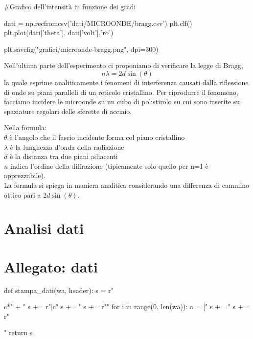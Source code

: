 \begin{sagesilent}
#Grafico dell'intensità in funzione dei gradi

dati = np.recfromcsv('dati/MICROONDE/bragg.csv')
plt.clf()
plt.plot(dati['theta'], dati['volt'],'ro')

plt.savefig("grafici/microonde-bragg.png", dpi=300)

\end{sagesilent}


Nell'ultima parte dell'esperimento ci proponiamo di verificare la legge di Bragg, 
\begin{equation}
n \lambda = 2 d \sin(\theta)
\end{equation}
la quale esprime analiticamente i fenomeni di interferenza causati dalla riflessione di onde su piani paralleli di un reticolo cristallino. Per riprodurre il fenomeno, facciamo incidere le microonde su un cubo di polistirolo su cui sono inserite su spaziature regolari delle sferette di acciaio.

Nella formula:\\
$\theta$ è l'angolo che il fascio incidente forma col piano cristallino\\
$\lambda$ è la lunghezza d'onda della radiazione\\
$d$ è la distanza tra due piani adiacenti\\
$n$ indica l'ordine della diffrazione (tipicamente solo quello per n=1 è apprezzabile).\\

La formula si spiega in maniera analitica considerando una differenza di cammino ottico pari a $2d\sin(\theta)$.



\section{Analisi dati}

\section{Allegato: dati}
\begin{sagesilent}
def stampa_dati(wa, header):
  s = r"\begin{tabular}{c*{" + "%
  s += r"}{|c}}"
  s += "%
  s += r"\midrule"
  for i in range(0, len(wa)):
    a = ["%
    s += "%
  s += r"\end{tabular}"
  return s
\end{sagesilent}

\begin{center}

\end{center}

